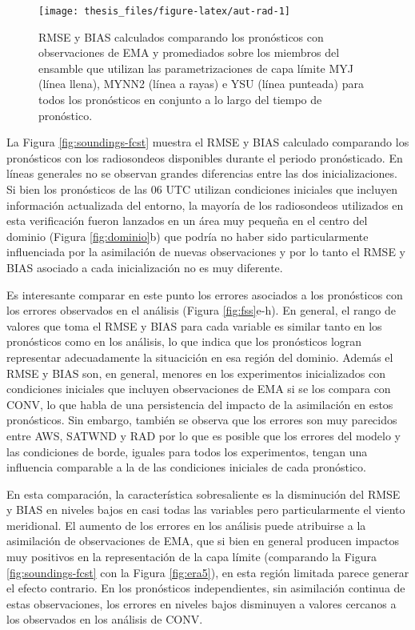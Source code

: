 \documentclass[12pt,oneside,a4paper]{reedthesis}
\begin{document}
\begin{figure}

{\centering \texttt{[image: thesis\_files/figure-latex/aut-rad-1]} 

}

\caption{RMSE y BIAS calculados comparando los pronósticos con observaciones de EMA y promediados sobre los miembros del ensamble que utilizan las parametrizaciones de capa límite MYJ (línea llena), MYNN2 (línea a rayas) e YSU (línea punteada) para todos los pronósticos en conjunto a lo largo del tiempo de pronóstico.}\label{fig:aut-rad}
\end{figure}
La Figura \ref{fig:soundings-fcst} muestra el RMSE y BIAS calculado comparando los pronósticos con los radiosondeos disponibles durante el periodo pronósticado. En líneas generales no se observan grandes diferencias entre las dos inicializaciones. Si bien los pronósticos de las 06 UTC utilizan condiciones iniciales que incluyen información actualizada del entorno, la mayoría de los radiosondeos utilizados en esta verificación fueron lanzados en un área muy pequeña en el centro del dominio (Figura \ref{fig:dominio}b) que podría no haber sido particularmente influenciada por la asimilación de nuevas observaciones y por lo tanto el RMSE y BIAS asociado a cada inicialización no es muy diferente.

Es interesante comparar en este punto los errores asociados a los pronósticos con los errores observados en el análisis (Figura \ref{fig:fss}e-h). En general, el rango de valores que toma el RMSE y BIAS para cada variable es similar tanto en los pronósticos como en los análisis, lo que indica que los pronósticos logran representar adecuadamente la situacición en esa región del dominio. Además el RMSE y BIAS son, en general, menores en los experimentos inicializados con condiciones iniciales que incluyen observaciones de EMA si se los compara con CONV, lo que habla de una persistencia del impacto de la asimilación en estos pronósticos. Sin embargo, también se observa que los errores son muy parecidos entre AWS, SATWND y RAD por lo que es posible que los errores del modelo y las condiciones de borde, iguales para todos los experimentos, tengan una influencia comparable a la de las condiciones iniciales de cada pronóstico.

En esta comparación, la característica sobresaliente es la disminución del RMSE y BIAS en niveles bajos en casi todas las variables pero particularmente el viento meridional. El aumento de los errores en los análisis puede atribuirse a la asimilación de observaciones de EMA, que si bien en general producen impactos muy positivos en la representación de la capa límite (comparando la Figura \ref{fig:soundings-fcst} con la Figura \ref{fig:era5}), en esta región limitada parece generar el efecto contrario. En los pronósticos independientes, sin asimilación continua de estas observaciones, los errores en niveles bajos disminuyen a valores cercanos a los observados en los análisis de CONV.
\end{document}
